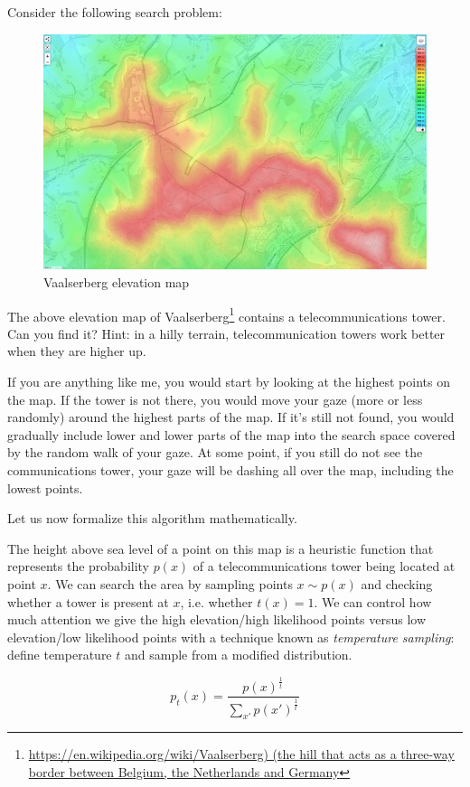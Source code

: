 Consider the following search problem:

\begin{figure}
    \centering
    \includegraphics[width=0.8\linewidth]{images/vaalserberg_lost.png}
    \caption{Vaalserberg elevation map}
\end{figure}


The above elevation map of Vaalserberg\footnote{\url{https://en.wikipedia.org/wiki/Vaalserberg) (the hill that acts as a three-way border between Belgium, the Netherlands and Germany}} contains a telecommunications tower. Can you find it? Hint: in a hilly terrain, telecommunication towers work better when they are higher up.

If you are anything like me, you would start by looking at the highest points on the map.
If the tower is not there, you would move your gaze (more or less randomly) around the highest parts of the map.
If it's still not found, you would gradually include lower and lower parts of the map into the search space covered by the random walk of your gaze.
At some point, if you still do not see the communications tower, your gaze will be dashing all over the map, including the lowest points.

Let us now formalize this algorithm mathematically.

The height above sea level of a point on this map is a heuristic function that represents the probability $p(x)$ of a telecommunications tower being located at point $x$.
We can search the area by sampling points $x \sim p(x)$ and checking whether a tower is present at $x$, i.e. whether $t(x)=1$.
We can control how much attention we give the high elevation/high likelihood points versus low elevation/low likelihood points with a technique known as \emph{temperature sampling}: define temperature $t$ and sample from a modified distribution.

\begin{equation}
p_t(x) = \frac{p(x)^{\frac{1}{t}}}{\sum_{x'} p(x')^{\frac{1}{t}}}
\end{equation}

